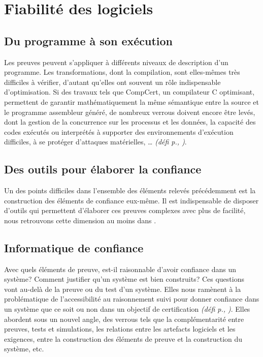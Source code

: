 \documentclass[11pt]{article}
\newcommand{\defi}[1]{\emph{(défi p.\pageref{#1}, \cite{#1})}}
\begin{document}
\section{Fiabilité des logiciels}

\subsection{Du programme à son exécution}
Les preuves peuvent s'appliquer à différents niveaux de description d'un programme. Les transformations, dont la compilation, sont elles-mêmes très difficiles à vérifier, d'autant qu'elles ont souvent un rôle indispensable d'optimisation. Si des travaux tels que CompCert, un compilateur C optimisant, permettent de garantir mathématiquement la même sémantique entre la source et le programme assembleur généré, de nombreux verrous doivent encore être levés, dont la gestion de la concurrence sur les processus et les données, la capacité des codes exécutés ou interprétés à supporter des environnements d'exécution difficiles, à se protéger d'attaques matérielles, … \defi{Monniaux}.

\subsection{Des outils pour élaborer la confiance}
Un des points difficiles dans l'ensemble des éléments relevés précédemment est la construction des éléments de confiance eux-même. Il est indispensable de disposer d'outils qui permettent d'élaborer ces preuves complexes avec plus de facilité, nous retrouvons cette dimension au moins dans \cite{Monniaux}.  

\subsection{Informatique de confiance}
Avec quels éléments de preuve, est-il raisonnable d'avoir confiance dans un système? Comment justifier qu'un système est bien construits? Ces questions vont au-delà de la preuve ou du test d'un système. Elles nous ramènent à  la problématique de l'accessibilité au raisonnement suivi pour donner confiance dans un système que ce soit ou non dans un objectif de certification \defi{argumentation}. 
Elles abordent sous un nouvel angle, des verrous tels que la 
complémentarité entre preuves, tests et simulations, les relations entre les artefacts logiciels et les exigences, entre la construction des éléments de preuve et la construction du système, etc. 
\end{document}
